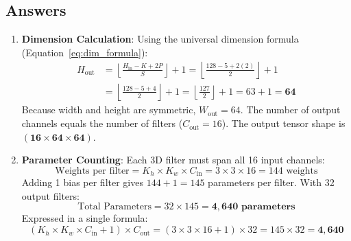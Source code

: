 \subsection*{Answers}\label{subsec:answers}

\begin{enumerate}
    \item \textbf{Dimension Calculation}:
    Using the universal dimension formula (Equation~\ref{eq:dim_formula}):
    \begin{align*}
    H_{\text{out}} &= \left\lfloor \frac{H_{\text{in}} - K + 2P}{S} \right\rfloor + 1 = \left\lfloor \frac{128 - 5 + 2(2)}{2} \right\rfloor + 1 \\
                   &= \left\lfloor \frac{128 - 5 + 4}{2} \right\rfloor + 1 = \left\lfloor \frac{127}{2} \right\rfloor + 1 = 63 + 1 = \mathbf{64}
    \end{align*}
    Because width and height are symmetric, $W_{\text{out}} = 64$. The number of output channels equals the number of filters ($C_{\text{out}} = 16$).
    The output tensor shape is $\mathbf{(16 \times 64 \times 64)}$.

    \item \textbf{Parameter Counting}:
    Each 3D filter must span all 16 input channels:
    \begin{equation*}
    \text{Weights per filter} = K_h \times K_w \times C_{\text{in}} = 3 \times 3 \times 16 = 144 \text{ weights}
    \end{equation*}
    Adding 1 bias per filter gives $144 + 1 = 145$ parameters per filter.
    With 32 output filters:
    \begin{equation*}
    \text{Total Parameters} = 32 \times 145 = \mathbf{4{,}640 \text{ parameters}}
    \end{equation*}
    Expressed in a single formula:
    \begin{equation*}
    (K_h \times K_w \times C_{\text{in}} + 1) \times C_{\text{out}} = (3 \times 3 \times 16 + 1) \times 32 = 145 \times 32 = \mathbf{4{,}640}
    \end{equation*}


\end{enumerate}
